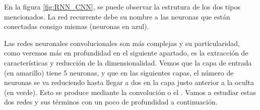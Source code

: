 
En la figura \ref{fig:RNN_CNN}, se puede observar la estrutura de los dos tipos mencionados. La red recurrente debe su nombre a las neuronas que están conectadas consigo mismas (neuronas en azul).

Las redes neuronales convolucionales son más complejas y su particularidad, como veremos más en profundidad en el siguiente apartado, es la extracción de características y reducción de la dimensionalidad. Vemos que la capa de entrada (en amarillo) tiene 5 neuronas, y que en las siguientes capas, el número de neuronas se va reduciendo hasta llegar a dos en la capa justo anterior a la oculta (en verde). Esto se produce mediante la convolución o el . Vamos a estudiar estas dos redes y sus términos con un poco de profundidad a continuación.

